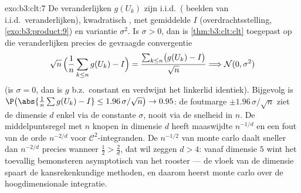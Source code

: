\begin{solution}{exo:b3:clt:7}
De veranderlijken $g(U_k)$ zijn i.i.d.\ ( beelden
van i.i.d.\ veranderlijken), kwadratisch , met
gemiddelde $I$ (overdrachtsstelling,
\cref{exo:b3:product:9}) en variantie $\sigma^2$. Is $\sigma
> 0$, dan is \cref{thm:b3:clt:clt} toegepast op die
veranderlijken precies de gevraagde convergentie
\[
\sqrt n\,\Bigl(\frac1n\sum_{k\leq n}g(U_k) - I\Bigr) =
\frac{\sum_{k\leq n}\bigl(g(U_k) - I\bigr)}{\sqrt n}
\Longrightarrow \mathcal N(0, \sigma^2)
\]
(is $\sigma = 0$, dan is $g$ b.z.\ constant en verdwijnt
het linkerlid identiek). Bijgevolg is
$\P\bigl(\abs{\frac1n\sum g(U_k) - I} \leq
1.96\,\sigma/\sqrt n\bigr) \to 0.95$: de foutmarge $\pm
1.96\,\sigma/\sqrt n$ ziet de dimensie $d$ enkel via de
constante $\sigma$, nooit via de snelheid in $n$. De
middelpuntsregel met $n$ knopen in dimensie $d$ heeft
maaswijdte $n^{-1/d}$ en een fout van de orde $n^{-2/d}$
voor $\mathcal C^2$-integranden. De $n^{-1/2}$ van monte
carlo daalt sneller dan $n^{-2/d}$ precies wanneer
$\frac12 > \frac2d$, dat wil zeggen $d > 4$: vanaf dimensie
$5$ wint het toevallig bemonsteren asymptotisch van het
rooster --- de vloek van de dimensie spaart de
kansrekenkundige methoden, en daarom heerst monte carlo
over de hoogdimensionale integratie.
\end{solution}

